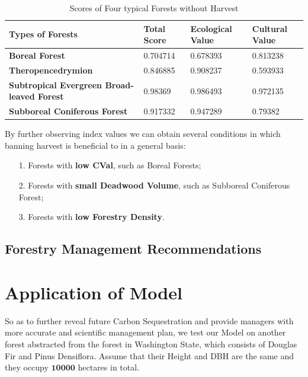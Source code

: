 \documentclass{mcmthesis}
\numberwithin{figure}{section}
\numberwithin{table}{section}
\numberwithin{equation}{section}
\begin{document}
\begin{table}[htpb!]
  \centering
  \caption{Scores of Four typical Forests without Harvest} \label{ForestScore-NoHarvest}
  \begin{tabular}{m{5.5cm}<{\centering}|m{3cm}<{\centering}|m{3cm}<{\centering}|m{3cm}<{\centering}}
  \rowcolor{lightBlue}  \textbf{Types of Forests}&\textbf{Total Score}&\textbf{Ecological Value}&\textbf{Cultural Value}\\ \hline
  \rowcolor{white} \textbf{Boreal Forest} & 0.704714 & 0.678393 & 0.813238 \\
  \rowcolor{lightBlue} \textbf{Theropencedrymion} &0.846885&0.908237&0.593933 \\
  \rowcolor{white} \textbf{Subtropical Evergreen Broad-leaved Forest} & 0.98369&0.986493 & 0.972135\\
  \rowcolor{lightBlue} \textbf{Subboreal Coniferous Forest} & 0.917332 & 0.947289 &0.79382 \\
  \end{tabular}
\end{table}

By further observing index values we can obtain several conditions in which banning
harvest is beneficial to in a general basis:
\begin{enumerate}
  \item [1.] Forests with \textbf{low CVal}, such as Boreal Forests;
  \item [2.] Forests with \textbf{small Deadwood Volume}, such as Subboreal Coniferous Forest;
  \item [3.] Forests with \textbf{low Forestry Density}.
\end{enumerate}


\subsection{Forestry Management Recommendations}







\section{Application of Model}
So as to further reveal future Carbon Sequestration and provide managers with 
more accurate and scientific management plan, we test our Model on another forest abstracted from the forest in Washington State, which 
consists of Douglas Fir and Pinus Densiflora. Assume that their Height and DBH are
the same and they occupy $ \bm{10000} $  hectares in total. 
\end{document}
